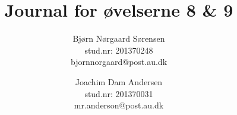 

	\chead{\myTitle}	\rhead{\today}
\lfoot{}		\cfoot{}			\rfoot{\thepage}
\renewcommand{\headrulewidth}{1pt}
\renewcommand{\footrulewidth}{0pt}

\newcommand{\myTitle}{\textbf{Journal for øvelserne 8 \& 9}}

\title{\myTitle}
\author{
	Bjørn Nørgaard Sørensen\\
	stud.nr: 201370248\\
	bjornnorgaard@post.au.dk
	\and
	Joachim Dam Andersen\\
	stud.nr: 201370031\\
	mr.anderson@post.au.dk
}


	\maketitle
	
	
	\newpage
	
	\newpage
	
	\newpage
	

